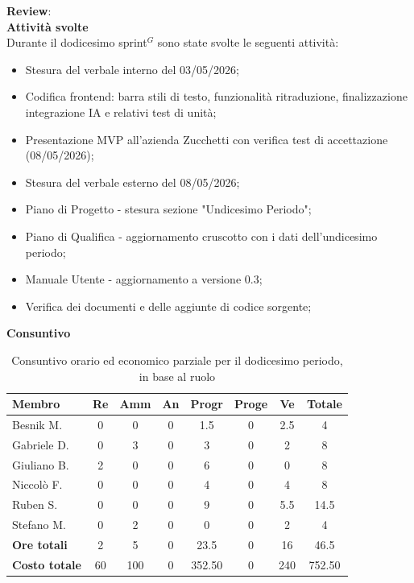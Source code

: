 \documentclass[a4paper,10pt]{article}
\begin{document}
\textbf{Review}: \\
\textbf{Attività svolte}\\
Durante il dodicesimo sprint$^G$ sono state svolte le seguenti attività:
\begin{itemize}
  \item Stesura del verbale interno del 03/05/2026;
  \item Codifica frontend: barra stili di testo, funzionalità ritraduzione, finalizzazione integrazione IA e relativi test di unità;
  \item Presentazione MVP all'azienda Zucchetti con verifica test di accettazione (08/05/2026);
  \item Stesura del verbale esterno del 08/05/2026;
  \item Piano di Progetto - stesura sezione "Undicesimo Periodo";
  \item Piano di Qualifica - aggiornamento cruscotto con i dati dell'undicesimo periodo;
  \item Manuale Utente - aggiornamento a versione 0.3;
  \item Verifica dei documenti e delle aggiunte di codice sorgente;
\end{itemize}
\textbf{Consuntivo}
\begin{table}[H]
\centering
\begin{tabular}{|l|c|c|c|c|c|c|c|}
\hline
\textbf{Membro} & \textbf{Re} & \textbf{Amm} & \textbf{An} & \textbf{Progr} & \textbf{Proge} & \textbf{Ve} & \textbf{Totale} \\
\hline
Besnik M.   & 0 & 0 & 0 & 1.5 & 0 & 2.5 & 4    \\
Gabriele D. & 0 & 3 & 0 & 3   & 0 & 2   & 8    \\
Giuliano B. & 2 & 0 & 0 & 6   & 0 & 0   & 8    \\
Niccolò F.  & 0 & 0 & 0 & 4   & 0 & 4   & 8    \\
Ruben S.    & 0 & 0 & 0 & 9   & 0 & 5.5 & 14.5 \\
Stefano M.  & 0 & 2 & 0 & 0   & 0 & 2   & 4    \\
\hline
\textbf{Ore totali} & 2  & 5 & 0 & 23.5  & 0 & 16 & 46.5 \\
\hline
\textbf{Costo totale} & 60 & 100 & 0 & 352.50  & 0  & 240 & 752.50 \\
\hline
\end{tabular}
\caption{Consuntivo orario ed economico parziale per il dodicesimo periodo, in base al ruolo}
\end{table}
\end{document}
